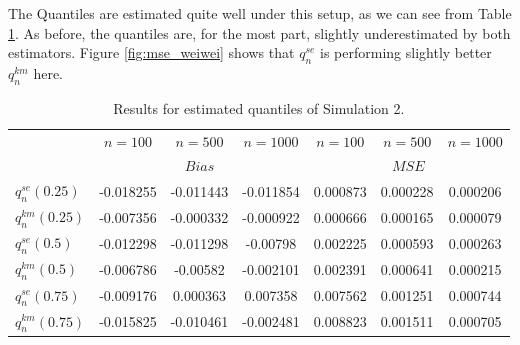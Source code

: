 %
\noindent The Quantiles are estimated quite well under this setup, as we can see from Table \ref{tab:res_weiwei2}. As before, the quantiles are, for the most part, slightly underestimated by both estimators. Figure \ref{fig:mse_weiwei} shows that $q_n^{se}$ is performing slightly better $q_n^{km}$ here.
\begin{table}[h!]
	\begin{center}
		\begin{tabular}{| l || c | c | c || c | c | c |}
			\hline
			&       $n=100$   &    $n=500$    &    $n=1000$ &       $n=100$   &    $n=500$    &    $n=1000$\\
			\cline{2-7}
			& \multicolumn{3}{c||}{$Bias$} &\multicolumn{3}{c|}{$MSE$}\\
			\hline
			\hline
			$q^{se}_n(0.25)$ & -0.018255 & -0.011443 & -0.011854& 0.000873 & 0.000228 & 0.000206\\
			$q^{km}_n(0.25)$ & -0.007356 & -0.000332 & -0.000922& 0.000666 & 0.000165 & 0.000079\\
			\hline
			$q^{se}_n(0.5)$ & -0.012298 & -0.011298 & -0.00798& 0.002225 & 0.000593 & 0.000263\\
			$q^{km}_n(0.5)$ & -0.006786 & -0.00582 & -0.002101 & 0.002391 & 0.000641 & 0.000215\\
			\hline
			$q^{se}_n(0.75)$ & -0.009176 & 0.000363 & 0.007358& 0.007562 & 0.001251 & 0.000744\\
			$q^{km}_n(0.75)$ & -0.015825 & -0.010461 & -0.002481 & 0.008823 & 0.001511 & 0.000705\\
			\hline
		\end{tabular}
	\end{center}
	\caption{Results for estimated quantiles of Simulation 2.}
	\label{tab:res_weiwei2}
\end{table}
%
%
%
